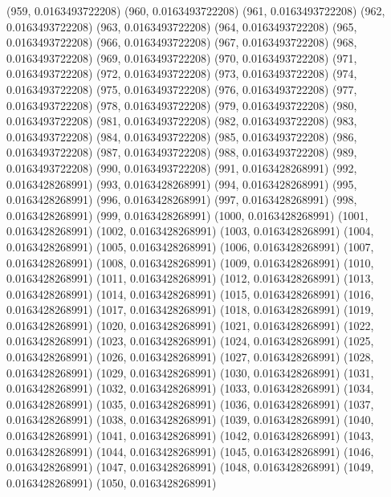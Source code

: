 {					(959, 0.0163493722208)
					(960, 0.0163493722208)
					(961, 0.0163493722208)
					(962, 0.0163493722208)
					(963, 0.0163493722208)
					(964, 0.0163493722208)
					(965, 0.0163493722208)
					(966, 0.0163493722208)
					(967, 0.0163493722208)
					(968, 0.0163493722208)
					(969, 0.0163493722208)
					(970, 0.0163493722208)
					(971, 0.0163493722208)
					(972, 0.0163493722208)
					(973, 0.0163493722208)
					(974, 0.0163493722208)
					(975, 0.0163493722208)
					(976, 0.0163493722208)
					(977, 0.0163493722208)
					(978, 0.0163493722208)
					(979, 0.0163493722208)
					(980, 0.0163493722208)
					(981, 0.0163493722208)
					(982, 0.0163493722208)
					(983, 0.0163493722208)
					(984, 0.0163493722208)
					(985, 0.0163493722208)
					(986, 0.0163493722208)
					(987, 0.0163493722208)
					(988, 0.0163493722208)
					(989, 0.0163493722208)
					(990, 0.0163493722208)
					(991, 0.0163428268991)
					(992, 0.0163428268991)
					(993, 0.0163428268991)
					(994, 0.0163428268991)
					(995, 0.0163428268991)
					(996, 0.0163428268991)
					(997, 0.0163428268991)
					(998, 0.0163428268991)
					(999, 0.0163428268991)
					(1000, 0.0163428268991)
					(1001, 0.0163428268991)
					(1002, 0.0163428268991)
					(1003, 0.0163428268991)
					(1004, 0.0163428268991)
					(1005, 0.0163428268991)
					(1006, 0.0163428268991)
					(1007, 0.0163428268991)
					(1008, 0.0163428268991)
					(1009, 0.0163428268991)
					(1010, 0.0163428268991)
					(1011, 0.0163428268991)
					(1012, 0.0163428268991)
					(1013, 0.0163428268991)
					(1014, 0.0163428268991)
					(1015, 0.0163428268991)
					(1016, 0.0163428268991)
					(1017, 0.0163428268991)
					(1018, 0.0163428268991)
					(1019, 0.0163428268991)
					(1020, 0.0163428268991)
					(1021, 0.0163428268991)
					(1022, 0.0163428268991)
					(1023, 0.0163428268991)
					(1024, 0.0163428268991)
					(1025, 0.0163428268991)
					(1026, 0.0163428268991)
					(1027, 0.0163428268991)
					(1028, 0.0163428268991)
					(1029, 0.0163428268991)
					(1030, 0.0163428268991)
					(1031, 0.0163428268991)
					(1032, 0.0163428268991)
					(1033, 0.0163428268991)
					(1034, 0.0163428268991)
					(1035, 0.0163428268991)
					(1036, 0.0163428268991)
					(1037, 0.0163428268991)
					(1038, 0.0163428268991)
					(1039, 0.0163428268991)
					(1040, 0.0163428268991)
					(1041, 0.0163428268991)
					(1042, 0.0163428268991)
					(1043, 0.0163428268991)
					(1044, 0.0163428268991)
					(1045, 0.0163428268991)
					(1046, 0.0163428268991)
					(1047, 0.0163428268991)
					(1048, 0.0163428268991)
					(1049, 0.0163428268991)
					(1050, 0.0163428268991)
}
